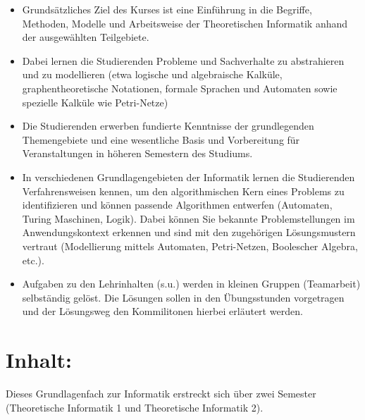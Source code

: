 \begin{itemize}
\item
  Grundsätzliches Ziel des Kurses ist eine Einführung in die Begriffe,
  Methoden, Modelle und Arbeitsweise der Theoretischen Informatik anhand
  der ausgewählten Teilgebiete.
\item
  Dabei lernen die Studierenden Probleme und Sachverhalte zu
  abstrahieren und zu modellieren (etwa logische und algebraische
  Kalküle, graphentheoretische Notationen, formale Sprachen und
  Automaten sowie spezielle Kalküle wie Petri-Netze)
\item
  Die Studierenden erwerben fundierte Kenntnisse der grundlegenden
  Themengebiete und eine wesentliche Basis und Vorbereitung für
  Veranstaltungen in höheren Semestern des Studiums.
\item
  In verschiedenen Grundlagengebieten der Informatik lernen die
  Studierenden Verfahrensweisen kennen, um den algorithmischen Kern
  eines Problems zu identifizieren und können passende Algorithmen
  entwerfen (Automaten, Turing Maschinen, Logik). Dabei können Sie
  bekannte Problemstellungen im Anwendungskontext erkennen und sind mit
  den zugehörigen Lösungsmustern vertraut (Modellierung mittels
  Automaten, Petri-Netzen, Boolescher Algebra, etc.).
\item
  Aufgaben zu den Lehrinhalten (s.u.) werden in kleinen Gruppen
  (Teamarbeit) selbständig gelöst. Die Lösungen sollen in den
  Übungsstunden vorgetragen und der Lösungsweg den Kommilitonen hierbei
  erläutert werden.
\end{itemize}

\section*{Inhalt:}\label{inhalt-24}

Dieses Grundlagenfach zur Informatik erstreckt sich über zwei Semester
(Theoretische Informatik 1 und Theoretische Informatik 2).


